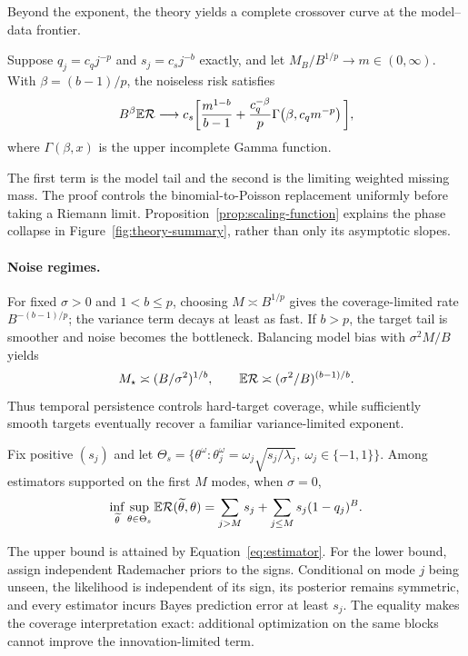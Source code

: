 Beyond the exponent, the theory yields a complete crossover curve at the
model--data frontier.

\begin{proposition}
\label{prop:scaling-function}
Suppose $q_j=c_qj^{-p}$ and $s_j=c_sj^{-b}$ exactly, and let
$M_B/B^{1/p}\to m\in(0,\infty)$.  With $\beta=(b-1)/p$, the noiseless risk
satisfies
\begin{align}
B^\beta\mathbb{E}\mathcal{R}\longrightarrow c_s\bigg[
\frac{m^{1-b}}{b-1}
+\frac{c_q^{-\beta}}{p}
\Gamma\!\left(\beta,c_qm^{-p}\right)\bigg],
\label{eq:scaling-function-main}
\end{align}
where $\Gamma(\beta,x)$ is the upper incomplete Gamma function.
\end{proposition}
The first term is the model tail and the second is the limiting weighted
missing mass.  The proof controls the binomial-to-Poisson replacement
uniformly before taking a Riemann limit.  Proposition~\ref{prop:scaling-function}
explains the phase collapse in Figure~\ref{fig:theory-summary}, rather than
only its asymptotic slopes.

\paragraph{Noise regimes.}
For fixed $\sigma>0$ and $1<b\le p$, choosing
$M\asymp B^{1/p}$ gives the coverage-limited rate
$B^{-(b-1)/p}$; the variance term decays at least as fast.  If $b>p$, the
target tail is smoother and noise becomes the bottleneck.  Balancing model
bias with $\sigma^2M/B$ yields
\begin{equation}
M_\star\asymp(B/\sigma^2)^{1/b},
\qquad
\mathbb{E}\mathcal{R}\mathrel{\asymp}(\sigma^2/B)^{(b-1)/b}.
\label{eq:smooth-noise-regime}
\end{equation}
Thus temporal persistence controls hard-target coverage, while sufficiently
smooth targets eventually recover a familiar variance-limited exponent.

\begin{theorem}
\label{thm:minimax}
Fix positive $(s_j)$ and let
$\Theta_s=\{\theta^\omega:\theta_j^\omega=\omega_j\sqrt{s_j/\lambda_j},
\ \omega_j\in\{-1,1\}\}$.  Among estimators supported on the first $M$ modes,
when $\sigma=0$,
\begin{equation}
\inf_{\widetilde\theta}\sup_{\theta\in\Theta_s}
\mathbb{E}\mathcal{R}(\widetilde\theta,\theta)
=\sum_{j>M}s_j+\sum_{j\le M}s_j(1-q_j)^B.
\label{eq:minimax}
\end{equation}
\end{theorem}
The upper bound is attained by Equation~\eqref{eq:estimator}.  For the lower
bound, assign independent Rademacher priors to the signs.  Conditional on mode
$j$ being unseen, the likelihood is independent of its sign, its posterior
remains symmetric, and every estimator incurs Bayes prediction error at least
$s_j$.  The equality makes the coverage interpretation exact: additional
optimization on the same blocks cannot improve the innovation-limited term.
